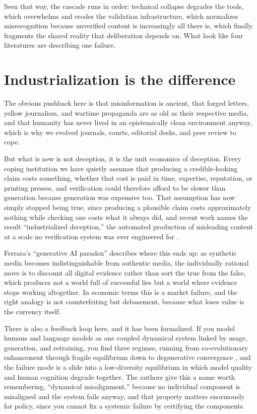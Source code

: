 \documentclass[11pt,letterpaper]{article}
\begin{document}
Seen that way, the cascade runs in order: technical collapse degrades the tools, which overwhelms and erodes the validation infrastructure, which normalizes misrecognition because unverified content is increasingly all there is, which finally fragments the shared reality that deliberation depends on. What look like four literatures are describing one failure.

\section{Industrialization is the difference}

The obvious pushback here is that misinformation is ancient, that forged letters, yellow journalism, and wartime propaganda are as old as their respective media, and that humanity has never lived in an epistemically clean environment anyway, which is why we evolved journals, courts, editorial desks, and peer review to cope.

But what is new is not deception, it is the unit economics of deception. Every coping institution we have quietly assumes that producing a credible-looking claim costs something, whether that cost is paid in time, expertise, reputation, or printing presses, and verification could therefore afford to be slower than generation because generation was expensive too. That assumption has now simply stopped being true, since producing a plausible claim costs approximately nothing while checking one costs what it always did, and recent work names the result ``industrialized deception,'' the automated production of misleading content at a scale no verification system was ever engineered for \citep{industrialized}.

Ferrara's ``generative AI paradox'' describes where this ends up: as synthetic media becomes indistinguishable from authentic media, the individually rational move is to discount all digital evidence rather than sort the true from the false, which produces not a world full of successful lies but a world where evidence stops working altogether. In economic terms this is a market failure, and the right analogy is not counterfeiting but debasement, because what loses value is the currency itself.

There is also a feedback loop here, and it has been formalized. If you model humans and language models as one coupled dynamical system linked by usage, generation, and retraining, you find three regimes, running from co-evolutionary enhancement through fragile equilibrium down to degenerative convergence \citep{coevolution}, and the failure mode is a slide into a low-diversity equilibrium in which model quality and human cognition degrade together. The authors give this a name worth remembering, ``dynamical misalignment,'' because no individual component is misaligned and the system fails anyway, and that property matters enormously for policy, since you cannot fix a systemic failure by certifying the components.
\end{document}
